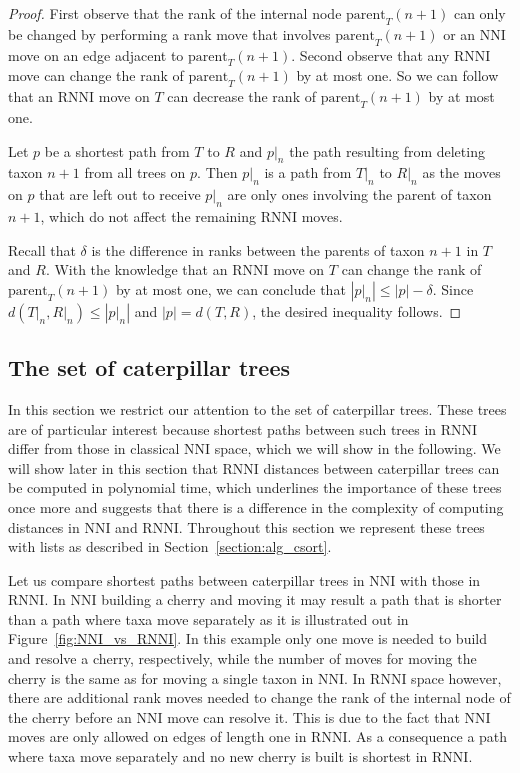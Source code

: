 \documentclass{amsart}
\newcommand{\parent}{\mathrm{parent}}
\newcommand{\nni}{\mathrm{NNI}}
\newcommand{\rnni}{\mathrm{RNNI}}
\begin{document}
\begin{proof}
First observe that the rank of the internal node $\parent_T(n+1)$ can only be changed by performing a rank move that involves $\parent_T(n+1)$ or an $\nni$ move on an edge adjacent to $\parent_T(n+1)$.
Second observe that any $\rnni$ move can change the rank of $\parent_T(n+1)$ by at most one.
So we can follow that an $\rnni$ move on $T$ can decrease the rank of $\parent_T(n+1)$ by at most one.

Let $p$ be a shortest path from $T$ to $R$ and $p{\big|}_n$ the path resulting from deleting taxon $n+1$ from all trees on $p$.
Then $p{\big|}_n$ is a path from $T{\big|}_n$ to $R{\big|}_n$ as the moves on $p$ that are left out to receive $p{\big|}_n$ are only ones involving the parent of taxon $n+1$, which do not affect the remaining $\rnni$ moves.

Recall that $\delta$ is the difference in ranks between the parents of taxon $n+1$ in $T$ and $R$.
With the knowledge that an $\rnni$ move on $T$ can change the rank of $\parent_T(n+1)$ by at most one, we can conclude that $|p{\big|}_n| \leq |p| - \delta$.
Since $d(T{\big|}_n,R{\big|}_n) \leq |p{\big|}_n|$ and $|p| = d(T,R)$, the desired inequality follows.
\end{proof}


\subsection{The set of caterpillar trees}
\label{section:caterpillar_convex}

In this section we restrict our attention to the set of caterpillar trees.
These trees are of particular interest because shortest paths between such trees in $\rnni$ differ from those in classical $\nni$ space, which we will show in the following.
We will show later in this section that $\rnni$ distances between caterpillar trees can be computed in polynomial time, which underlines the importance of these trees once more and suggests that there is a difference in the complexity of computing distances in $\nni$ and $\rnni$.
Throughout this section we represent these trees with lists as described in Section~\ref{section:alg_csort}.

Let us compare shortest paths between caterpillar trees in $\nni$ with those in $\rnni$.
In $\nni$ building a cherry and moving it may result a path that is shorter than a path where taxa move separately as it is illustrated out in Figure~\ref{fig:NNI_vs_RNNI}.
In this example only one move is needed to build and resolve a cherry, respectively, while the number of moves for moving the cherry is the same as for moving a single taxon in $\nni$.
In $\rnni$ space however, there are additional rank moves needed to change the rank of the internal node of the cherry before an $\nni$ move can resolve it.
This is due to the fact that $\nni$ moves are only allowed on edges of length one in $\rnni$.
As a consequence a path where taxa move separately and no new cherry is built is shortest in $\rnni$.
\end{document}
